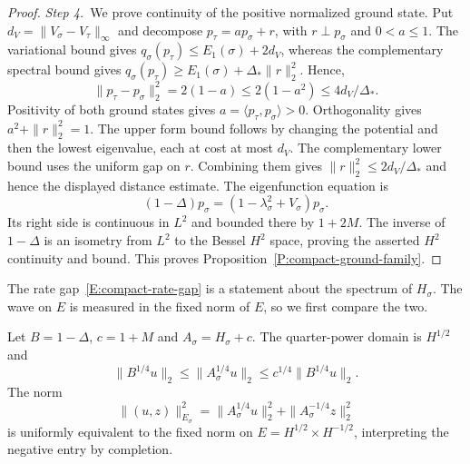 \begin{proof}
  \medskip
  \noindent\textit{Step 4.~}We prove continuity of the positive normalized
  ground state.
  Put $d_V = \|V_\sigma-V_\tau\|_\infty$ and decompose $p_\tau = a p_\sigma+r$,
  with $r\perp p_\sigma$ and $0 < a \le 1$. The variational bound gives
  $q_\sigma(p_\tau) \le E_1(\sigma)+2d_V$, whereas the complementary spectral
  bound gives $q_\sigma(p_\tau) \ge E_1(\sigma)+\Delta_*\|r\|_2^2$. Hence,
  \begin{equation}\label{E:compact-ground-continuity}
    \|p_\tau-p_\sigma\|_2^2
    =2(1-a)\le2(1-a^2)\le4d_V/\Delta_*.
  \end{equation}
  Positivity of both ground states gives $a = \langle p_\tau,p_\sigma\rangle >
  0$. Orthogonality gives $a^2+\|r\|_2^2 = 1$. The upper form bound follows by
  changing the potential and then the lowest eigenvalue, each at cost at most
  $d_V$. The complementary lower bound uses the uniform gap on $r$. Combining
  them gives $\|r\|_2^2 \le 2d_V/\Delta_*$ and hence the displayed distance
  estimate.
  The eigenfunction equation is
  \[
    (1-\Delta)p_\sigma
    =(1-\lambda_\sigma^2+V_\sigma)p_\sigma.
  \]
  Its right side is continuous in $L^2$ and bounded there by $1+2M$. The inverse
  of $1-\Delta$ is an isometry from $L^2$ to the Bessel $H^2$ space, proving the
  asserted $H^2$ continuity and bound. This proves
  Proposition~\ref{P:compact-ground-family}.
\end{proof}

The rate gap~\eqref{E:compact-rate-gap} is a statement about the spectrum of
$H_\sigma$. The wave on $E$ is measured in the fixed norm of $E$, so we first
compare the two.

\begin{lemma}\label{L:compact-fractional-phase}
  Let $B = 1-\Delta$, $c = 1+M$ and $A_\sigma = H_\sigma+c$. The quarter-power
  domain is $H^{1/2}$ and
  \begin{equation}\label{E:compact-quarter-power}
    \|B^{1/4}u\|_2\le\|A_\sigma^{1/4}u\|_2
    \le c^{1/4}\|B^{1/4}u\|_2.
  \end{equation}
  The norm
  \begin{equation}\label{E:compact-spectral-phase-norm}
    \|(u,z)\|_{E_\sigma}^2
    =\|A_\sigma^{1/4}u\|_2^2
    +\|A_\sigma^{-1/4}z\|_2^2
  \end{equation}
  is uniformly equivalent to the fixed norm on $E = H^{1/2}\times H^{-1/2}$,
  interpreting the negative entry by completion.
\end{lemma}

